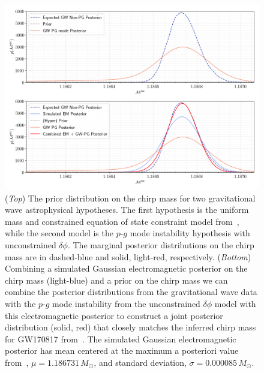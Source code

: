 \begin{figure}[th]
\centering
\includegraphics[width=0.9\columnwidth]{figs/chapter6/em_posterior_fix.png}
\caption{(\textit{Top}) The prior distribution on the chirp mass for two gravitational wave astrophysical hypotheses. The first hypothesis is the uniform mass and constrained equation of state constraint model from~\cite{de2018tidal}, while the second model is the $p$-$g$ mode instability hypothesis with unconstrained $\delta \phi$. The marginal posterior distributions on the chirp mass are in dashed-blue and solid, light-red, respectively. (\textit{Bottom}) Combining a simulated Gaussian electromagnetic posterior on the chirp mass (light-blue) and a prior on the chirp mass we can combine the posterior distributions from the gravitational wave data with the $p$-$g$ mode instability from the unconstrained $\delta \phi$ model with this electromagnetic posterior to construct a joint posterior distribution (solid, red) that closely matches the inferred chirp mass for GW170817 from~\cite{de2018tidal}. The simulated Gaussian electromagnetic posterior has mean centered at the maximum a posteriori value from~\cite{de2018tidal}, $\mu = 1.186731 \, M_\odot$, and standard deviation, $\sigma = 0.000085 \, M_\odot$.}
\label{fig:em_posterior_analysis}
\end{figure}


